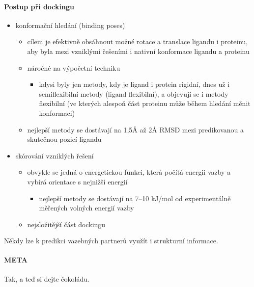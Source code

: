 \documentclass[DIV=8]{scrreprt}
\newcommand{\mybox}[2]{
    \paragraph{#1} #2
}
\begin{document}
\paragraph{Postup při dockingu}
\begin{itemize}[nosep]
    \item konformační hledání (binding poses)
\begin{itemize}[nosep]
    \item cílem je efektivně obsáhnout možné rotace a translace ligandu i proteinu, aby byla mezi vzniklými řešeními i nativní konformace ligandu a proteinu
    \item náročné na výpočetní techniku
\begin{itemize}[nosep]
    \item kdysi byly jen metody, kdy je ligand i protein rigidní, dnes už i semiflexibilní metody (ligand flexibilní), a objevují se i metody flexibilní (ve kterých alespoň část proteinu může během hledání měnit konformaci)
\end{itemize}

    \item nejlepší metody se dostávají na 1,5Å až 2Å RMSD mezi predikovanou a skutečnou pozicí ligandu
\end{itemize}

    \item skórování vzniklých řešení
\begin{itemize}[nosep]
    \item obvykle se jedná o energetickou funkci, která počítá energii vazby a vybírá orientace s nejnižší energií
\begin{itemize}[nosep]
    \item nejlepší metody se dostávají na 7--10 kJ/mol od experimentálně měřených volných energií vazby
\end{itemize}

    \item nejsložitější část dockingu
\end{itemize}

\end{itemize}



Někdy lze k predikci vazebných partnerů využít i strukturní informace.

\mybox{META}{Tak, a teď si dejte čokoládu.}
\end{document}
